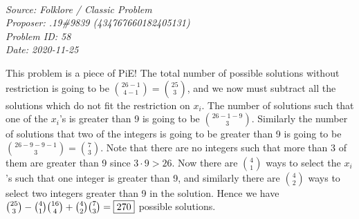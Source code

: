 \SSbreak\\
\emph{Source: Folklore / Classic Problem}\\
\emph{Proposer: .19\#9839 (434767660182405131)}\\
\emph{Problem ID: 58}\\
\emph{Date: 2020-11-25}\\
\SSbreak

\bigskip

\begin{solution}\hfil\medskip

    This problem is a piece of PiE! The total number of possible solutions without restriction is going to be \(\binom{26-1}{4-1}=\binom{25}{3}\), and we now must subtract all the solutions which do not fit the restriction on \(x_i\). 
    The number of solutions such that one of the \(x_i\)'s is greater than 9 is going to be \(\binom{26-1-9}{3}\). 
    Similarly the number of solutions that two of the integers is going to be greater than 9 is going to be \(\binom{26-9-9-1}{3}=\binom{7}{3}\). 
    Note that there are no integers such that more than 3 of them are greater than 9 since \(3\cdot9>26\). 
    Now there are \(\binom{4}{1}\) ways to select the \(x_i\)'s such that one integer is greater than 9, and similarly there are \(\binom{4}{2}\) ways to select two integers greater than 9 in the solution. Hence we have \(\binom{25}{3}-\binom{4}{1}\binom{16}{4}+\binom{4}{2}\binom{7}{3}=\fbox{270}\) possible solutions.
\end{solution}